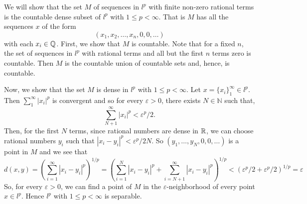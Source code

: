 
\begin{solution}
    We will show that the set $M$ of sequences in $l^p$
    with finite non-zero rational terms is
    the countable dense
    subset of $l^p$ with $1\leq p<\infty$. That is
    $M$ has all the sequences $x$ of the form
    $$(x_1,x_2,\ldots,x_n,0,0,\ldots)$$
    with each $x_i\in\mathbb{Q}$.
    First, we show
    that $M$ is countable. Note that for a fixed $n$, the
    set of sequences in $l^p$ with rational terms
    and all but the first $n$
    terms zero is countable. Then $M$ is the countable
    union of countable sets and, hence, is countable.

    \vspace*{3mm}
    Now, we show that the set $M$ is dense in $l^p$
    with $1 \leq p <\infty$. Let $x=\{x_i\}_1^\infty
    \in l^p$. Then $\sum_1^\infty{|x_i|^p}$ is
    convergent and so for every
    $\varepsilon>0$, there exists $N\in\mathbb{N}$ such
    that,
    $$\sum_{N+1}^\infty{|x_i|^p}<\varepsilon^p/2.$$
    Then, for the first $N$ terms, since rational numbers
    are dense in $\mathbb{R}$, we can choose rational numbers
    $y_i$ such that $|x_i-y_i|^p<\varepsilon^p/2N$.
    So $(y_1,\ldots,y_N,0,0,\ldots)$ is a point in $M$ and
    we see that
    $$d(x,y)=\left(\sum_{i=1}^\infty{|x_i-y_i|^p}\right)
    ^{1/p}=\left(\sum_{i=1}^N{|x_i-y_i|^p}
    +\sum_{i=N+1}^\infty{|x_i-y_i|^p}\right)
    ^{1/p}<(\varepsilon^p/2+\varepsilon^p/2)^{1/p}
    =\varepsilon$$
    So, for every $\varepsilon>0$, we can find a point
    of $M$ in the $\varepsilon$-neighborhood of every
    point $x\in l^p$. Hence $l^p$ with
    $1 \leq p <\infty$ is separable.
\end{solution}